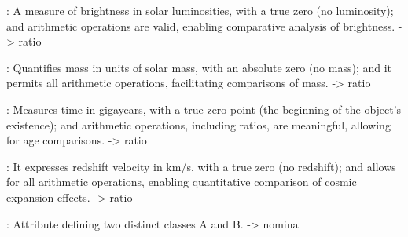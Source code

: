 : A measure of brightness in solar luminosities, with a true zero (no luminosity); and arithmetic operations are valid, enabling comparative analysis of brightness. -> ratio

: Quantifies mass in units of solar mass, with an absolute zero (no mass); and it permits all arithmetic operations, facilitating comparisons of mass. -> ratio

: Measures time in gigayears, with a true zero point (the beginning of the object's existence); and arithmetic operations, including ratios, are meaningful, allowing for age comparisons. -> ratio

: It expresses redshift velocity in km/s, with a true zero (no redshift); and allows for all arithmetic operations, enabling quantitative comparison of cosmic expansion effects. -> ratio

: Attribute defining two distinct classes A and B. -> nominal



